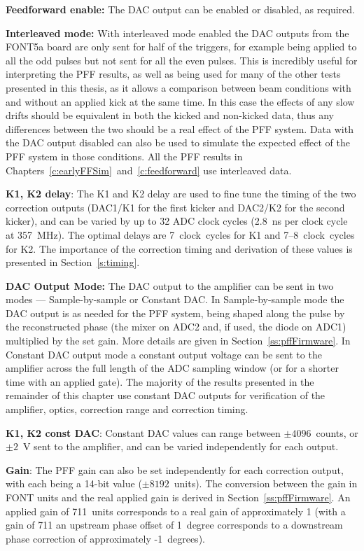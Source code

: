 \textbf{Feedforward enable:} The DAC output can be enabled or disabled, as required.

\textbf{Interleaved mode:} With interleaved mode enabled the DAC outputs from the FONT5a board are only sent for half of the triggers, for example being applied to all the odd pulses but not sent for all the even pulses. This is incredibly useful for interpreting the PFF results, as well as being used for many of the other tests presented in this thesis, as it allows a comparison between beam conditions with and without an applied kick at the same time. In this case the effects of any slow drifts should be equivalent in both the kicked and non-kicked data, thus any differences between the two should be a real effect of the PFF system. Data with the DAC output disabled can also be used to simulate the expected effect of the PFF system in those conditions. All the PFF results in Chapters~\ref{c:earlyFFSim}~and~\ref{c:feedforward} use interleaved data.

\textbf{K1, K2 delay}: The K1 and K2 delay are used to fine tune the timing of the two correction outputs (DAC1/K1 for the first kicker and DAC2/K2 for the second kicker), and can be varied by up to 32 ADC clock cycles (2.8~ns per clock cycle at 357~MHz). The optimal delays are 7~clock~cycles for K1 and 7--8~clock~cycles for K2. The importance of the correction timing and derivation of these values is presented in Section~\ref{s:timing}.

\textbf{DAC Output Mode:} The DAC output to the amplifier can be sent in two modes --- Sample-by-sample or Constant DAC. In Sample-by-sample mode the DAC output is as needed for the PFF system, being shaped along the pulse by the reconstructed phase (the mixer on ADC2 and, if used, the diode on ADC1) multiplied by the set gain. More details are given in Section~\ref{ss:pffFirmware}. In Constant DAC output mode a constant output voltage can be sent to the amplifier across the full length of the ADC sampling window (or for a shorter time with an applied gate). The majority of the results presented in the remainder of this chapter use constant DAC outputs for verification of the amplifier, optics, correction range and correction timing.

\textbf{K1, K2 const DAC}: Constant DAC values can range between \(\pm4096\)~counts, or \(\pm2\)~V sent to the amplifier, and can be varied independently for each output.

\textbf{Gain}: The PFF gain can also be set independently for each correction output, with each being a 14-bit value (\(\pm8192\)~units). The conversion between the gain in FONT units and the real applied gain is derived in Section~\ref{ss:pffFirmware}. An applied gain of 711~units corresponds to a real gain of approximately 1 (with a gain of 711 an upstream phase offset of 1~degree corresponds to a downstream phase correction of approximately -1~degrees).

